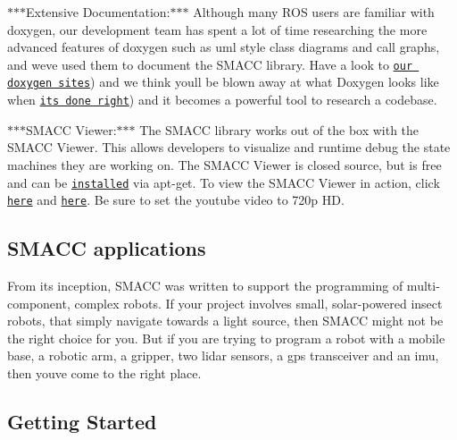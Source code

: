 \begin{DoxyItemize}
\begin{DoxyItemize}
\item $\ast$$\ast$$\ast$\+Extensive Documentation\+:$\ast$$\ast$$\ast$ Although many R\+OS users are familiar with doxygen, our development team has spent a lot of time researching the more advanced features of doxygen such as uml style class diagrams and call graphs, and we\textquotesingle{}ve used them to document the S\+M\+A\+CC library. Have a look to \href{https://reelrbtx.github.io/SMACC_Documentation/master/html/namespaces.html}{\tt our doxygen sites}) and we think you\textquotesingle{}ll be blown away at what Doxygen looks like when \href{https://reelrbtx.github.io/SMACC_Documentation/master/html/classsmacc_1_1ISmaccStateMachine.html}{\tt it\textquotesingle{}s done right}) and it becomes a powerful tool to research a codebase.
\item $\ast$$\ast$$\ast$\+S\+M\+A\+CC Viewer\+:$\ast$$\ast$$\ast$ The S\+M\+A\+CC library works out of the box with the S\+M\+A\+CC Viewer. This allows developers to visualize and runtime debug the state machines they are working on. The S\+M\+A\+CC Viewer is closed source, but is free and can be \href{http://smacc.ninja/smacc-viewer/}{\tt installed} via apt-\/get. To view the S\+M\+A\+CC Viewer in action, click \href{https://www.youtube.com/watch?v=WVt4M_teA5I}{\tt here} and \href{https://www.youtube.com/watch?v=fdy37WvC4FQ}{\tt here}. Be sure to set the youtube video to 720p HD.
\end{DoxyItemize}
\end{DoxyItemize}

\subsection*{S\+M\+A\+CC applications}

From it\textquotesingle{}s inception, S\+M\+A\+CC was written to support the programming of multi-\/component, complex robots. If your project involves small, solar-\/powered insect robots, that simply navigate towards a light source, then S\+M\+A\+CC might not be the right choice for you. But if you are trying to program a robot with a mobile base, a robotic arm, a gripper, two lidar sensors, a gps transceiver and an imu, then you\textquotesingle{}ve come to the right place.

 

\subsection*{Getting Started}

